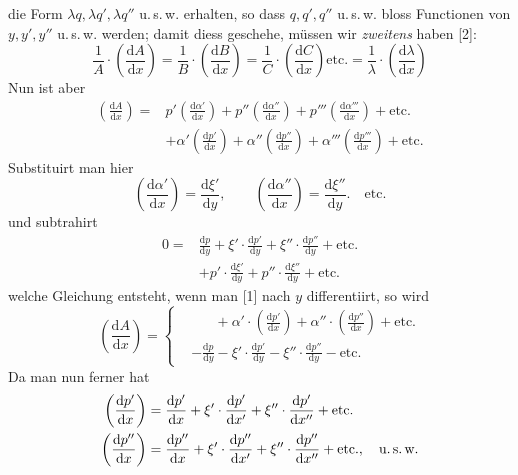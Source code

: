 die Form $\lambda q,\lambda q',\lambda q''$ u.\,s.\,w. erhalten, so dass $q,q',q''$ u.\,s.\,w. bloss Functionen
von $y,y',y''$ u.\,s.\,w. werden; damit diess geschehe, müssen wir \emph{zweitens} haben [2]:
\[
\frac{1}{A}\cdot\left(\frac{\mathrm{d}A}{\mathrm{d}x}\right)
=\frac{1}{B}\cdot\left(\frac{\mathrm{d}B}{\mathrm{d}x}\right)
=\frac{1}{C}\cdot\left(\frac{\mathrm{d}C}{\mathrm{d}x}\right)\text{etc.}
=\frac{1}{\lambda}\cdot\left(\frac{\mathrm{d}\lambda}{\mathrm{d}x}\right)
\]
Nun ist aber
\[
\begin{aligned}
\left(\frac{\mathrm{d}A}{\mathrm{d}x}\right)={}&
p'\left(\frac{\mathrm{d}\alpha'}{\mathrm{d}x}\right)
+p''\left(\frac{\mathrm{d}\alpha''}{\mathrm{d}x}\right)
+p'''\left(\frac{\mathrm{d}\alpha'''}{\mathrm{d}x}\right)+\text{etc.}\\
&+\alpha'\left(\frac{\mathrm{d}p'}{\mathrm{d}x}\right)
+\alpha''\left(\frac{\mathrm{d}p''}{\mathrm{d}x}\right)
+\alpha'''\left(\frac{\mathrm{d}p'''}{\mathrm{d}x}\right)+\text{etc.}
\end{aligned}
\]
Substituirt man hier
\[
\left(\frac{\mathrm{d}\alpha'}{\mathrm{d}x}\right)=\frac{\mathrm{d}\xi'}{\mathrm{d}y},\qquad
\left(\frac{\mathrm{d}\alpha''}{\mathrm{d}x}\right)=\frac{\mathrm{d}\xi''}{\mathrm{d}y}.\quad\text{etc.}
\]
und subtrahirt
\[
\begin{aligned}
0={}&\frac{\mathrm{d}p}{\mathrm{d}y}
+\xi'\cdot\frac{\mathrm{d}p'}{\mathrm{d}y}
+\xi''\cdot\frac{\mathrm{d}p''}{\mathrm{d}y}+\text{etc.}\\
&+p'\cdot\frac{\mathrm{d}\xi'}{\mathrm{d}y}
+p''\cdot\frac{\mathrm{d}\xi''}{\mathrm{d}y}+\text{etc.}
\end{aligned}
\]
welche Gleichung entsteht, wenn man [1] nach $y$ differentiirt, so wird
\[
\left(\frac{\mathrm{d}A}{\mathrm{d}x}\right)=
\left\{\begin{aligned}
&\phantom{-\frac{\mathrm{d}p}{\mathrm{d}y}}+\alpha'\cdot\left(\frac{\mathrm{d}p'}{\mathrm{d}x}\right)
+\alpha''\cdot\left(\frac{\mathrm{d}p''}{\mathrm{d}x}\right)+\text{etc.}\\
&-\frac{\mathrm{d}p}{\mathrm{d}y}-\xi'\cdot\frac{\mathrm{d}p'}{\mathrm{d}y}
-\xi''\cdot\frac{\mathrm{d}p''}{\mathrm{d}y}-\text{etc.}
\end{aligned}\right.
\]
Da man nun ferner hat
\[
\begin{aligned}
\left(\frac{\mathrm{d}p'}{\mathrm{d}x}\right)&=\frac{\mathrm{d}p'}{\mathrm{d}x}
+\xi'\cdot\frac{\mathrm{d}p'}{\mathrm{d}x'}
+\xi''\cdot\frac{\mathrm{d}p'}{\mathrm{d}x''}+\text{etc.}\\
\left(\frac{\mathrm{d}p''}{\mathrm{d}x}\right)&=\frac{\mathrm{d}p''}{\mathrm{d}x}
+\xi'\cdot\frac{\mathrm{d}p''}{\mathrm{d}x'}
+\xi''\cdot\frac{\mathrm{d}p''}{\mathrm{d}x''}+\text{etc.},\quad\text{u.\,s.\,w.}
\end{aligned}
\]
